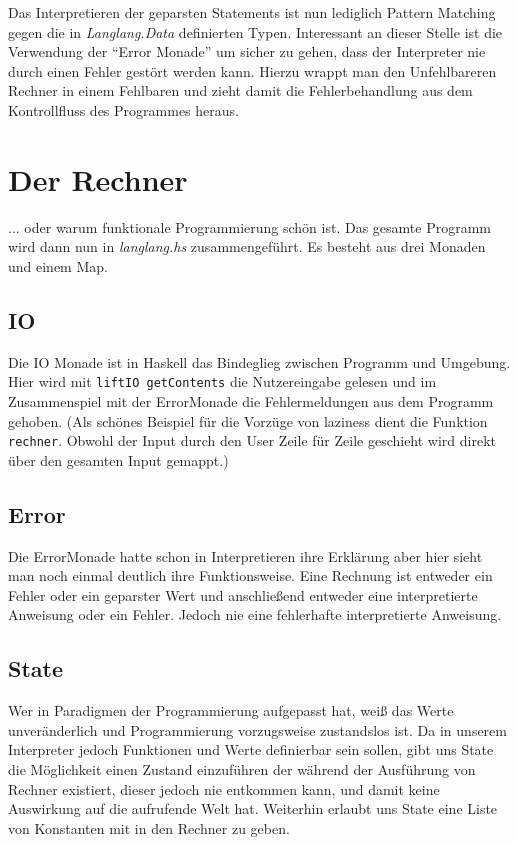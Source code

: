 \documentclass[12pt,german]{article}
\begin{document}
Das Interpretieren der geparsten Statements ist nun lediglich Pattern
Matching gegen die in \textit{Langlang.Data} definierten Typen.
Interessant an dieser Stelle ist die Verwendung der ``Error Monade''
um sicher zu gehen, dass der Interpreter nie durch einen Fehler gestört
werden kann. Hierzu wrappt man den Unfehlbareren
Rechner in einem Fehlbaren und zieht damit die Fehlerbehandlung aus
dem Kontrollfluss des Programmes heraus.

\section{Der Rechner}

... oder warum funktionale Programmierung schön ist. Das gesamte Programm wird dann nun in \textit{langlang.hs}
zusammengeführt. Es besteht aus drei Monaden und einem Map.
\subsection{IO }

Die IO Monade ist in Haskell das Bindeglieg zwischen Programm und
Umgebung. Hier wird mit \texttt{liftIO getContents} die Nutzereingabe
gelesen und im Zusammenspiel mit der ErrorMonade die Fehlermeldungen
aus dem Programm gehoben. (Als schönes Beispiel für die Vorzüge von
laziness dient die Funktion \texttt{rechner}. Obwohl der Input durch den User
Zeile für Zeile geschieht wird direkt über den gesamten Input gemappt.)\cite{IO14}

\subsection{Error}

Die ErrorMonade hatte schon in Interpretieren ihre Erklärung aber hier
sieht man noch einmal deutlich ihre Funktionsweise. Eine Rechnung ist
entweder ein Fehler oder ein geparster Wert und anschließend entweder
eine interpretierte Anweisung oder ein Fehler. Jedoch nie eine
fehlerhafte interpretierte Anweisung.\cite{ER14}

\subsection{State}

Wer in Paradigmen der Programmierung aufgepasst hat, weiß das Werte
unveränderlich und Programmierung vorzugsweise zustandslos ist. Da in
unserem Interpreter jedoch Funktionen und Werte definierbar sein
sollen, gibt uns State die Möglichkeit einen Zustand einzuführen der
während der Ausführung von Rechner existiert, dieser jedoch nie
entkommen kann, und damit keine Auswirkung auf die aufrufende Welt
hat. Weiterhin erlaubt uns State eine Liste von Konstanten mit in den
Rechner zu geben.\cite{ST14}
\end{document}
